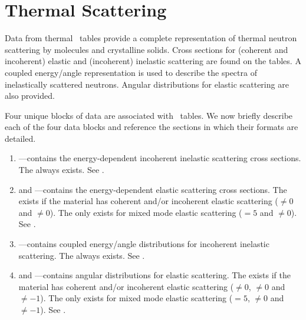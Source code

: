 \section[Thermal Scattering]{Thermal Scattering \SaB}\label{sec:ThermalScattering}

Data from thermal \SaB\ tables provide a complete representation of thermal neutron scattering by molecules
and crystalline solids. Cross sections for (coherent and incoherent) elastic and (incoherent) inelastic
scattering are found on the tables. A coupled energy/angle representation is used to describe the spectra
of inelastically scattered neutrons. Angular distributions for elastic scattering are also provided.

Four unique blocks of data are associated with \SaB\ tables. We now briefly describe each of the four data
blocks and reference the sections in which their formats are detailed.

\begin{enumerate}
  \item \textbf{}---contains the energy-dependent incoherent inelastic scattering cross sections.
                                The   always exists. See .
  \item \textbf{} and \textbf{}---contains the energy-dependent elastic scattering cross sections.
                                The  exists if the material has coherent and/or incoherent elastic scattering
                                ($\neq0$ and $\neq0$). The  only exists for mixed mode elastic scattering
                                ($=5$ and $\neq0$). See .
  \item \textbf{}---contains coupled energy/angle distributions for incoherent inelastic scattering.
                                The  always exists. See .
  \item \textbf{} and \textbf{}---contains angular distributions for elastic scattering.
                                The  exists if the material has coherent and/or incoherent elastic scattering
                                ($\neq0$, $\neq0$ and $\neq-1$). The  only exists for mixed mode
                                elastic scattering ($=5$, $\neq0$ and $\neq-1$). See .
\end{enumerate}

